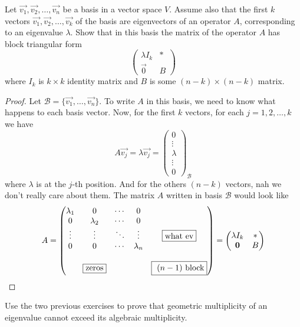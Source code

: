 \documentclass{article}
\begin{document}
\begin{exercise}
  Let $\vec{v_1},\vec{v_2},\dots,\vec{v_n}$ be a basis in a vector 
  space $V$. Assume also that the first $k$ vectors 
  $\vec{v_1},\vec{v_2},\dots,\vec{v_k}$ of the basis are eigenvectors
  of an operator $A$, corresponding to an eigenvalue $\lambda$. Show
  that in this basis the matrix of the operator $A$ has block 
  triangular form 
  \[\begin{pmatrix}\lambda I_k&*\\\vec{0}&B\end{pmatrix}\]
  where $I_k$ is $k\times k$ identity matrix and $B$ is some 
  $(n-k)\times (n-k)$ matrix.
\end{exercise}
\begin{proof}
  Let $\mathcal B=\{\vec{v_1},\dots,\vec{v_n}\}$. To write $A$ in this
  basis, we need to know what happens to each basis vector. Now, 
  for the first $k$ vectors, for each $j=1,2,\dots,k$ we have
  \[
    A\vec{v_j}=\lambda\vec{v_j}=
    \begin{pmatrix}0\\\vdots\\\lambda\\\vdots\\0\end{pmatrix}
    _{\mathcal B}
  \]
  where $\lambda$ is at the $j$-th position. And for the others
  $(n-k)$ vectors, nah we don't really care about them. The matrix 
  $A$ written in basis $\mathcal B$ would look like
  \[
    A=
    \begin{pmatrix}
      \lambda_1 & 0 & \cdots & 0 & \\
      0 & \lambda_2 & \cdots & 0 & \\
      \vdots & \vdots & \ddots & \vdots & \text{\fbox{what ev}}\\
      0 & 0 & \cdots & \lambda_n & \\
        &&&&\\
        & \text{\fbox{zeros}} &&&\text{\fbox{ $(n-1)$ block}}
    \end{pmatrix}=
    \begin{pmatrix}
      \lambda I_k&*\\\vec{0}&B
    \end{pmatrix}
  \]
\end{proof}
\begin{exercise}
  Use the two previous exercises to prove that geometric multiplicity
  of an eigenvalue cannot exceed its algebraic multiplicity.
\end{exercise}
\end{document}
